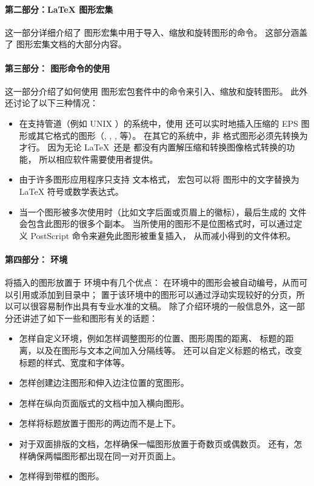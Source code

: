 \paragraph{第二部分：\LaTeX{} 图形宏集}
这一部分详细介绍了 \LaTeXe{} 图形宏集中用于导入、缩放和旋转图形的命令。
这部分涵盖了 \LaTeXe{} 图形宏集文档的大部分内容\cite{grfguide}。

\paragraph{第三部分：\LaTeXe{} 图形命令的使用}
这一部分介绍了如何使用 \LaTeXe{} 图形宏包套件中的命令来引入、缩放和旋转图形。
此外还讨论了以下三种情况：
\begin{itemize}
	\item 在支持管道（例如 UNIX ）的系统中，使用  还可以实时地插入压缩的 EPS 图形或其它格式的图形（, , ,  等）。
	在其它的系统中，非  格式图形必须先转换为  才行。
	因为无论 \LaTeX\ 还是  都没有内置解压缩和转换图像格式转换的功能，
	所以相应软件需要使用者提供。
	\item 由于许多图形应用程序只支持 \ascii 文本格式，
	 宏包可以将  图形中的文字替换为 \LaTeX{} 符号或数学表达式。
	\item 当一个图形被多次使用时（比如文字后面或页眉上的徽标），最后生成的  文件会包含此图形的很多个副本。
	当所使用的图形不是位图格式时，可以通过定义 PostScript 命令来避免此图形被重复插入，
	从而减小得到的文件体积。
\end{itemize}

\paragraph{第四部分： 环境}
将插入的图形放置于 环境中有几个优点：
在环境中的图形会被自动编号，从而可以引用或添加到目录中；
置于该环境中的图形可以通过浮动实现较好的分页，所以可以很容易制作出具有专业水准的文稿。
除了介绍环境的一般信息外，这一部分还讲述了如下一些和图形有关的话题：
\begin{itemize}
	\item 怎样自定义环境，例如怎样调整图形的位置、图形周围的距离、
	标题的距离，以及在图形与文本之间加入分隔线等。
	还可以自定义标题的格式，改变标题的样式、宽度和字体等。
	\item 怎样创建边注图形和伸入边注位置的宽图形。
	\item 怎样在纵向页面版式的文档中加入横向图形。
	\item 怎样将标题放置于图形的两边而不是上下。
	\item 对于双面排版的文档，怎样确保一幅图形放置于奇数页或偶数页。
	还有，怎样确保两幅图形都出现在同一对开页面上。
	\item 怎样得到带框的图形。
\end{itemize}

